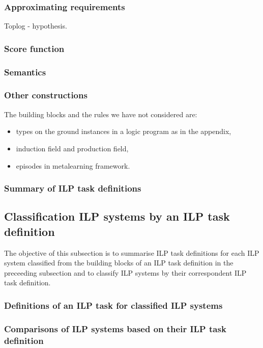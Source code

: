\subsubsection{Approximating requirements}
Toplog - hypothesis.

\subsubsection{Score function}

\subsubsection{Semantics}

\subsubsection{Other constructions}
The building blocks and the rules we have not considered are:
\begin{itemize}
\item types on the ground instances in a logic program as in the appendix,
\item induction field\cite{yamamoto2012inverse} and production field\cite{inoue2004induction},
\item episodes in metalearning framework\cite{muggleton2013meta}.
\end{itemize}

\subsubsection{Summary of ILP task definitions}

\subsection{Classification ILP systems by an ILP task definition}
The objective of this subsection is to summarise ILP task definitions for each ILP system classified from the building blocks of an ILP task definition in the preceeding subsection  and to classify ILP systems by their correspondent ILP task definition.

\subsubsection{Definitions of an ILP task for classified ILP systems}

\subsubsection{Comparisons of ILP systems based on their ILP task definition}

